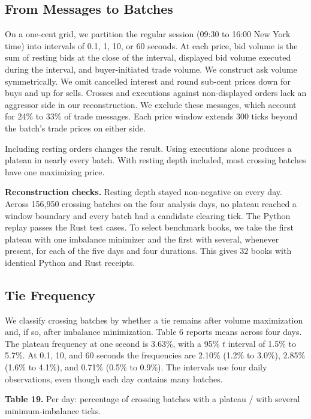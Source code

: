 \subsection{From Messages to Batches}

On a one-cent grid, we partition the regular session (09:30 to 16:00 New York time) into intervals of 0.1, 1, 10, or 60 seconds. At each price, bid volume is the sum of resting bids at the close of the interval, displayed bid volume executed during the interval, and buyer-initiated trade volume. We construct ask volume symmetrically. We omit cancelled interest and round sub-cent prices down for buys and up for sells. Crosses and executions against non-displayed orders lack an aggressor side in our reconstruction. We exclude these messages, which account for 24\% to 33\% of trade messages. Each price window extends 300 ticks beyond the batch's trade prices on either side.

Including resting orders changes the result. Using executions alone produces a plateau in nearly every batch. With resting depth included, most crossing batches have one maximizing price.

\textbf{Reconstruction checks.} Resting depth stayed non-negative on every day. Across 156,950 crossing batches on the four analysis days, no plateau reached a window boundary and every batch had a candidate clearing tick. The Python replay passes the Rust test cases. To select benchmark books, we take the first plateau with one imbalance minimizer and the first with several, whenever present, for each of the five days and four durations. This gives 32 books with identical Python and Rust receipts.

\subsection{Tie Frequency}

We classify crossing batches by whether a tie remains after volume maximization and, if so, after imbalance minimization. Table 6 reports means across four days. The plateau frequency at one second is 3.63\%, with a 95\% \(t\) interval of 1.5\% to 5.7\%. At 0.1, 10, and 60 seconds the frequencies are 2.10\% (1.2\% to 3.0\%), 2.85\% (1.6\% to 4.1\%), and 0.71\% (0.5\% to 0.9\%). The intervals use four daily observations, even though each day contains many batches.

\textbf{Table 19.} Per day: percentage of crossing batches with a plateau / with several minimum-imbalance ticks.


